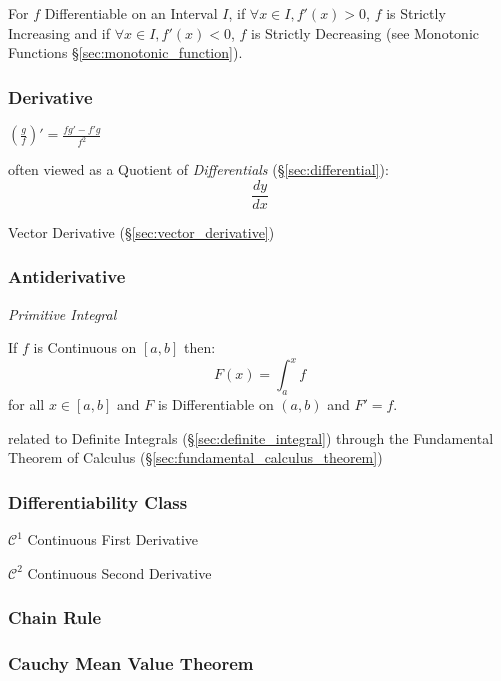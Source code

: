 For $f$ Differentiable on an Interval $I$, if $\forall x \in I, f'(x)
> 0$, $f$ is Strictly Increasing and if $\forall x \in I, f'(x) < 0$,
$f$ is Strictly Decreasing (see Monotonic Functions
\S\ref{sec:monotonic_function}).



\subsubsection{Derivative}\label{sec:derivative}

$(\frac{g}{f})' = \frac{f g' - f' g}{f^2}$

often viewed as a Quotient of \emph{Differentials} (\S\ref{sec:differential}):
\[
  \frac{dy}{dx}
\]

\fist Vector Derivative (\S\ref{sec:vector_derivative})



\subsubsection{Antiderivative}\label{sec:antiderivative}

\emph{Primitive Integral}

If $f$ is Continuous on $[a,b]$ then:
\[
  F(x) = \int_a^x f
\]
for all $x \in [a,b]$ and $F$ is Differentiable on $(a,b)$ and $F' =
f$.

\fist related to Definite Integrals (\S\ref{sec:definite_integral}) through the
Fundamental Theorem of Calculus (\S\ref{sec:fundamental_calculus_theorem})



\subsubsection{Differentiability Class}
\label{sec:differentiability_class}

$\mathcal{C}^1$ Continuous First Derivative

$\mathcal{C}^2$ Continuous Second Derivative



\subsubsection{Chain Rule}\label{sec:chain_rule}

\subsubsection{Cauchy Mean Value Theorem}
\label{sec:cauchy_mean_value}

